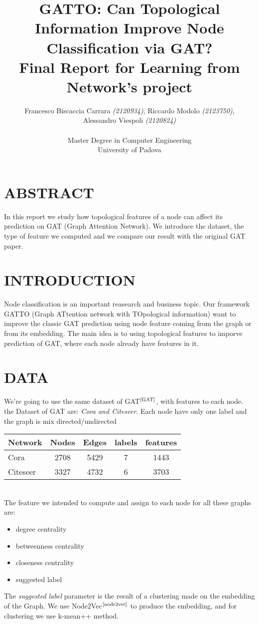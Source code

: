 \documentclass[12pt,conference]{ieeeconf} %
\title{GATTO: Can Topological Information Improve Node Classification via GAT?\\
\large Final Report for Learning from Network's project \\}
\author{Francesco Biscaccia Carrara \textit{(2120934)}, Riccardo Modolo \textit{(2123750)},\\ Alessandro Viespoli \textit{(2120824)} %
\\\\ Master Degree in Computer Engineering \\
University of Padova \\
}
\begin{document}
\maketitle
\thispagestyle{plain}
\pagestyle{plain}

\section{ABSTRACT} 
In this report we study how topological features of a node can affect its prediction on GAT (Graph Attention Network).
We introduce the dataset, the type of feature we computed and we compare our result with the 
original GAT paper.

\section{INTRODUCTION} 
Node classification is an important reasearch and business topic.
Our framework GATTO (Graph ATtention network with TOpological information) want to 
improve the classic GAT prediction using node feature coming from the graph or from its 
embedding. The main idea is to using topological features to imporve prediction of GAT, where each node already have features in it. 

\section{DATA} 
We're going to use the same dataset of GAT$^\text{\cite{GAT}}$, with features to each node.
the Dataset of GAT are: \textit{Cora and Citeseer}. Each node have only one label and the graph is mix directed/undirected
\\
\begin{table}[h!]
    \centering
    \renewcommand{\arraystretch}{1.5}
    \begin{tabular}{|l|c|c|c|c|}
    \hline
    \textbf{Network} & \textbf{Nodes} & \textbf{Edges} & \textbf{labels} & \textbf{features} \\
    \hline
    Cora           & 2708 & 5429  & 7  & 1443  \\
    Citeseer       & 3327 & 4732  & 6  & 3703  \\
    \hline
    \end{tabular}
\end{table}
\\
The feature we intended to compute and assign to each node for all these graphs are:
\begin{itemize}
    \item degree centrality
    \item betweenness centrality
    \item closeness centrality
    \item suggested label
\end{itemize}
The \textit{suggested label} parameter is the result of a clustering made on the embedding of the Graph.
We use Node2Vec$^\text{\cite{node2vec}}$ to produce the embedding, and for clustering we use k-mean++ method.
\end{document}
